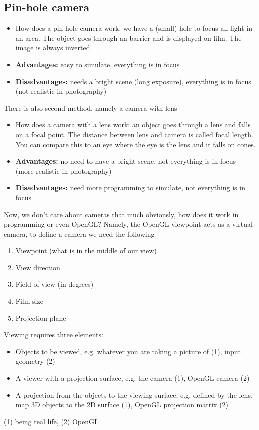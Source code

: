 \documentclass[11pt]{article}
\begin{document}
\subsection{Pin-hole camera}
\begin{itemize}
    \item How does a pin-hole camera work: we have a (small) hole to focus all light in an area. The object goes through an barrier and is displayed on film. The image is always inverted
    \item \textbf{Advantages:} easy to simulate, everything is in focus
    \item \textbf{Disadvantages: } needs a bright scene (long exposure), everything is in focus (not realistic in photography)  
\end{itemize}

There is also second method, namely a camera with lens
\begin{itemize}
    \item How does a camera with a lens work: an object goes through a lens and falls on a focal point. The distance between lens and camera is called focal length. You can compare this to an eye where the eye is the lens and it falls on cones. 
    \item \textbf{Advantages: } no need to have a bright scene, not everything is in focus (more realistic in photography)
    \item \textbf{Disadvantages: } need more programming to simulate, not everything is in focus  
\end{itemize}

Now, we don't care about cameras that much obviously, how does it work in programming or even OpenGL?
Namely, the OpenGL viewpoint acts as a virtual camera, to define a camera we need the following
\begin{enumerate}
    \item Viewpoint (what is in the middle of our view)
    \item View direction
    \item Field of view (in degrees)
    \item Film size 
    \item Projection plane
\end{enumerate}

Viewing requires three elements:
\begin{itemize}
    \item Objects to be viewed, e.g. whatever you are taking a picture of (1), input geometry (2)
    \item A viewer with a projection surface, e.g. the camera (1), OpenGL camera (2)
    \item A projection from the objects to the viewing surface, e.g. defined by the lens, map 3D objects to the 2D surface (1), OpenGL projection matrix (2)
\end{itemize}
(1) being real life, (2) OpenGL
\end{document}
